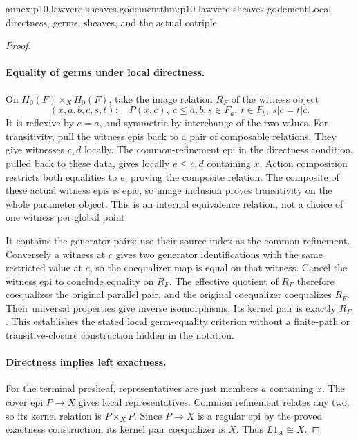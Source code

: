 \begin{annexitem}{annex:p10.lawvere-sheaves.godement}{thm:p10-lawvere-sheaves-godement}{Local directness, germs, sheaves, and the actual cotriple}
\begin{proof}
\paragraph{Equality of germs under local directness.}
On \(H_0(F)\times_XH_0(F)\), take the image relation
\(R_F\) of the witness object
\[
 (x,a,b,c,s,t):\quad P(x,c),\ c\leq a,b,
                 s\in F_a,\ t\in F_b,\ s|c=t|c.
\]
It is reflexive by \(c=a\), and symmetric by
interchange of the two values.  For transitivity,
pull the witness epis back to a pair of composable
relations.  They give witnesses \(c,d\) locally.
The common-refinement epi in the directness condition,
pulled back to these data, gives locally \(e\leq c,d\)
containing \(x\).  Action composition restricts both
equalities to \(e\), proving the composite relation.
The composite of these actual witness epis is epic,
so image inclusion proves transitivity on the whole
parameter object.  This is an internal equivalence
relation, not a choice of one witness per global point.

It contains the generator pairs: use their source index
as the common refinement.  Conversely a witness at
\(c\) gives two generator identifications with the
same restricted value at \(c\), so the coequalizer
map is equal on that witness.  Cancel the witness epi
to conclude equality on \(R_F\).  The effective
quotient of \(R_F\) therefore coequalizes the original
parallel pair, and the original coequalizer coequalizes
\(R_F\).  Their universal properties give inverse
isomorphisms.  Its kernel pair is exactly \(R_F\).
This establishes the stated local germ-equality
criterion without a finite-path or transitive-closure
construction hidden in the notation.

\paragraph{Directness implies left exactness.}
For the terminal presheaf, representatives are just
members \(a\) containing \(x\).  The cover epi
\(P\to X\) gives local representatives.  Common
refinement relates any two, so its kernel relation is
\(P\times_XP\).  Since \(P\to X\) is a regular
epi by the proved exactness construction, its kernel
pair coequalizer is \(X\).  Thus \(L1_A\cong X\).


\end{proof}
\end{annexitem}
